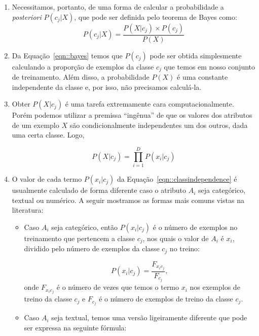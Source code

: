 \begin{enumerate}
    \item Necessitamos, portanto, de uma forma de calcular a probabilidade a \textit{posteriori} $P(c_j| X)$, que pode ser definida pelo teorema de Bayes como:
\begin{equation}\label{eqn::bayes}
   P(c_{j}|X) = \frac{P(X|c_j) \times P(c_j) }{P(X)}
\end{equation}

    \item Da Equação~\ref{eqn::bayes} temos que $P(c_j)$ pode ser obtida simplesmente calculando a proporção de exemplos da classe $c_j$ que temos em nosso conjunto de treinamento. Além disso, a probabilidade $P(X)$ é uma constante independente da classe e, por isso, não precisamos calculá-la.
       
    \item Obter $P(X|c_j)$ é uma tarefa extremamente cara computacionalmente. Porém podemos utilizar a premissa ``ingênua'' 
    de que os valores dos atributos de um exemplo $X$ são condicionalmente independentes um dos outros, dada uma certa classe. Logo,

\begin{equation}\label{eqn::classindependence}
   P(X|c_{j}) = \prod^{D}_{i=1}{P(x_i|c_j) }
\end{equation}

\item O valor de cada termo $P(x_i|c_j)$ da Equação~\ref{eqn::classindependence} é usualmente calculado de forma diferente caso o atributo $A_i$ seja categórico, textual ou numérico. A seguir mostramos as formas mais comuns vistas na literatura:
    \begin{itemize}

        \item Caso $A_i$ seja categórico, então $P(x_i|c_j)$ é o número de exemplos no treinamento que pertencem a classe $c_j$, nos quais o valor de $A_i$ é $x_i$, dividido pelo número de exemplos da classe $c_j$ no treino:

    \begin{equation}\label{eqn::nbcattexto}
        P(x_i|c_j) = \frac{ F_{x_{i}c_{j}} }{ F_{c_{j}} },
    \end{equation}
        onde $F_{x_{i}c_{j}}$ é o número de vezes que temos o termo $x_i$ nos exemplos de treino da classe $c_j$ e $F_{c_{j}}$ é o número de exemplos de treino da classe $c_j$.
        
        \item Caso $A_i$ seja textual, temos uma versão ligeiramente diferente que pode ser expressa na seguinte fórmula:


\end{itemize}
\end{enumerate}
